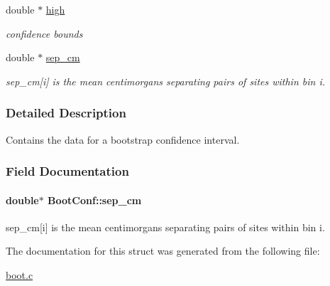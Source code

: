 \begin{DoxyCompactItemize}
\item 
\hypertarget{struct_boot_conf_a0daa885809da2a6e7599bced779127d9}{double $\ast$ \hyperlink{struct_boot_conf_a0daa885809da2a6e7599bced779127d9}{high}}\label{struct_boot_conf_a0daa885809da2a6e7599bced779127d9}

\begin{DoxyCompactList}\small\item\em confidence bounds \end{DoxyCompactList}\item 
double $\ast$ \hyperlink{struct_boot_conf_a9c77f42dd63b54e4c46fe697982d63ef}{sep\-\_\-cm}
\begin{DoxyCompactList}\small\item\em sep\-\_\-cm\mbox{[}i\mbox{]} is the mean centimorgans separating pairs of sites within bin i. \end{DoxyCompactList}\end{DoxyCompactItemize}


\subsubsection{\-Detailed \-Description}
\-Contains the data for a bootstrap confidence interval. 



\subsubsection{\-Field \-Documentation}
\hypertarget{struct_boot_conf_a9c77f42dd63b54e4c46fe697982d63ef}{
\paragraph[{sep\-\_\-cm}]{\setlength{\rightskip}{0pt plus 5cm}double$\ast$ {\bf \-Boot\-Conf\-::sep\-\_\-cm}}}\label{struct_boot_conf_a9c77f42dd63b54e4c46fe697982d63ef}


sep\-\_\-cm\mbox{[}i\mbox{]} is the mean centimorgans separating pairs of sites within bin i. 



\-The documentation for this struct was generated from the following file\-:\begin{DoxyCompactItemize}
\item 
\hyperlink{boot_8c}{boot.\-c}\end{DoxyCompactItemize}
